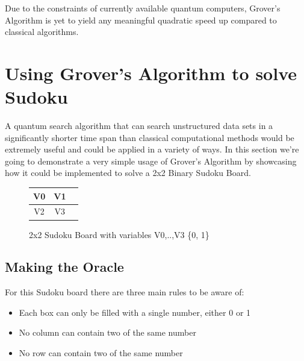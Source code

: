 \documentclass{article}
\begin{document}
\noindent
Due to the constraints of currently available quantum computers, Grover's Algorithm is yet to yield any  meaningful quadratic speed up compared to classical algorithms\cite{noauthor_grovers_2022}.

\pagebreak
\section{Using Grover's Algorithm to solve Sudoku}

A quantum search algorithm that can search unstructured data sets in a significantly shorter time span than classical computational methods would be extremely useful and could be applied in a variety of ways. In this section we're going to demonstrate a very simple usage of Grover's Algorithm by showcasing how it could be implemented to solve a 2x2 Binary Sudoku Board. 

\setlength{\arrayrulewidth}{0.5mm}
\setlength{\tabcolsep}{18pt}
\renewcommand{\arraystretch}{1.5}
\begin{figure}[h]
\begin{center}
    

\begin{tabular}{ |c|c|c| } 
\hline
V0 & V1  \\ 
\hline
V2 & V3 \\ 
\hline
\end{tabular}
\end{center}
\caption{2x2 Sudoku Board with variables V0,..,V3 \in \{0, 1\}}
\label{fig:Sudoku Board}
\end{figure}

\subsection{Making the Oracle}\label{Making the Oracle 2x2}


For this Sudoku board there are three main rules to be aware of:
\begin{itemize}
    \item Each box can only be filled with a single number, either 0 or 1
    \item No column can contain two of the same number
    \item No row can contain two of the same number
\end{itemize}
\end{document}
